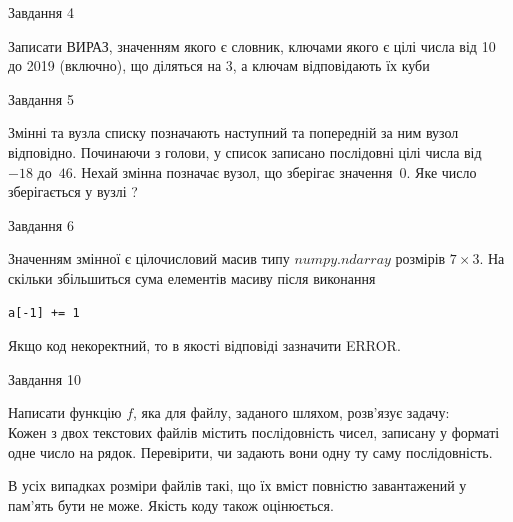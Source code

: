 \documentclass[12pt, ukrainian]{article}
\begin{document}
{\begin{minipage}[t]{8.0cm}
\end{minipage}


               
{\begin{center}Завдання {4}\end{center}}
\vspace{-4mm}
Записати ВИРАЗ, значенням якого є словник, ключами якого є цілі числа від 10 до 2019 (включно), що діляться на 3, а ключам відповідають їх куби\par

\vspace{10mm}
               
{\begin{center}Завдання {5}\end{center}}
\vspace{-4mm}
Змінні  та  вузла списку позначають наступний та попередній за ним вузол відповідно. Починаючи з голови, у список записано послідовні цілі числа від~$-18$ до~$46$. Нехай змінна  позначає вузол, що зберігає значення~$0$.
Яке число зберігається у вузлі  ?\par

               
{\begin{center}Завдання {6}\end{center}}
\vspace{-4mm}
Значенням змінної  є цілочисловий масив типу $numpy.ndarray$ розмірів $7{\times}3$. На скільки збільшиться сума елементів масиву  після виконання
\begin{verbatim}
a[-1] += 1
\end{verbatim}


Якщо код некоректний, то в якості відповіді зазначити ERROR.\par

               
{\begin{center}Завдання {10}\end{center}}
\vspace{-4mm}

Написати функцію $f$, яка для файлу, заданого шляхом, розв’язує задачу:\\ Кожен з двох текстових файлів містить послідовність чисел, записану у форматі одне число на рядок.  Перевірити, чи задають вони одну ту саму послідовність.

В усіх випадках розміри файлів такі, що їх вміст повністю завантажений у пам'ять бути не може. Якість коду також оцінюється.



}
\end{document}
